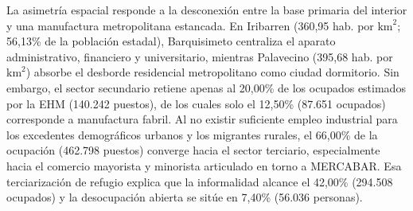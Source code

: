 \documentclass[12pt,letterpaper]{article}
\begin{document}
La asimetría espacial responde a la desconexión entre la base primaria del interior y una manufactura metropolitana estancada. En Iribarren (360,95 hab. por $\text{km}^2$; 56,13\% de la población estadal), Barquisimeto centraliza el aparato administrativo, financiero y universitario, mientras Palavecino (395,68 hab. por $\text{km}^2$) absorbe el desborde residencial metropolitano como ciudad dormitorio. Sin embargo, el sector secundario retiene apenas al 20,00\% de los ocupados estimados por la EHM (140.242 puestos), de los cuales solo el 12,50\% (87.651 ocupados) corresponde a manufactura fabril. Al no existir suficiente empleo industrial para los excedentes demográficos urbanos y los migrantes rurales, el 66,00\% de la ocupación (462.798 puestos) converge hacia el sector terciario, especialmente hacia el comercio mayorista y minorista articulado en torno a MERCABAR. Esa terciarización de refugio explica que la informalidad alcance el 42,00\% (294.508 ocupados) y la desocupación abierta se sitúe en 7,40\% (56.036 personas).
\end{document}
